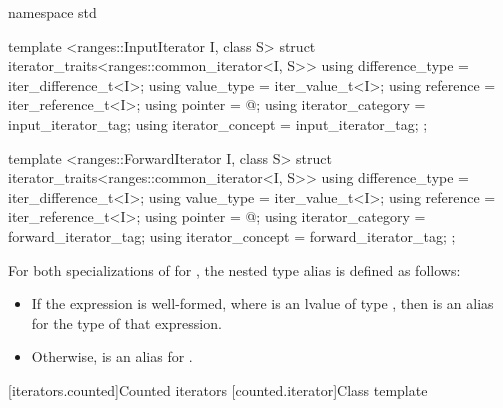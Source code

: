 \begin{addedblock}
\begin{codeblock}
namespace std {
  template <ranges::InputIterator I, class S>
  struct iterator_traits<ranges::common_iterator<I, S>> {
    using difference_type = iter_difference_t<I>;
    using value_type = iter_value_t<I>;
    using reference = iter_reference_t<I>;
    using pointer = @\seebelow@;
    using iterator_category = input_iterator_tag;
    using iterator_concept = input_iterator_tag;
  };

  template <ranges::ForwardIterator I, class S>
  struct iterator_traits<ranges::common_iterator<I, S>> {
    using difference_type = iter_difference_t<I>;
    using value_type = iter_value_t<I>;
    using reference = iter_reference_t<I>;
    using pointer = @\seebelow@;
    using iterator_category = forward_iterator_tag;
    using iterator_concept = forward_iterator_tag;
  };
}
\end{codeblock}

\pnum
For both specializations of  for
, the nested  type alias is defined
as follows:
\begin{itemize}
\item If the expression  is well-formed, where 
is an lvalue of type , then
 is an alias for the type of that expression.
\item Otherwise,  is an alias for .
\end{itemize}
\end{addedblock}

\setcounter{subsection}{5}
[iterators.counted]{Counted iterators}
[counted.iterator]{Class template }


